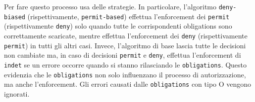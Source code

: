 Per fare questo processo usa delle strategie. In particolare, l'algoritmo \texttt{deny-biased} (rispettivamente, \texttt{permit-based}) effettua l'enforcement dei \texttt{permit} (rispettivamente \texttt{deny}) solo quando tutte le corrispondenti obligations sono correttamente scaricate, mentre effettua l'enforcement dei \texttt{deny} (rispettivamente \texttt{permit}) in tutti gli altri casi. Invece, l'algoritmo di base lascia tutte le decisioni non cambiate ma, in caso di decisioni \texttt{permit} e \texttt{deny}, effettua l'enforcement di \texttt{indet} se un errore occorre quando si stanno rilasciando le \texttt{obligations}. Questo evidenzia che le \texttt{obligations} non solo influenzano il processo di autorizzazione, ma anche l'enforcement. Gli errori causati dalle \texttt{obligations} con tipo O vengono ignorati.


